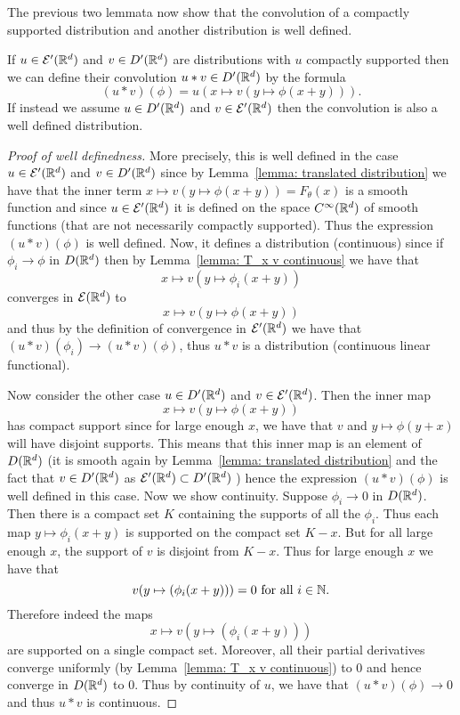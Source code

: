 \documentclass[twoside, a4paper, 10pt]{amsart}
\begin{document}
The previous two lemmata now show that the convolution of a compactly supported distribution and another distribution is well defined.

\begin{mydef} If $u \in \mathcal{E}'(\mathbb{R}^d)$ and $v \in D'(\mathbb{R}^d)$ are distributions with $u$ compactly supported then we can define their convolution $u * v \in D'(\mathbb{R}^d)$ by the formula $$(u * v)(\phi) = u(x \mapsto v(y \mapsto \phi(x+y))).$$ If instead we assume $u \in D'(\mathbb{R}^d)$ and $v \in \mathcal{E}'(\mathbb{R}^d)$ then the convolution is also a well defined distribution.

\end{mydef}

\begin{proof}[Proof of well definedness] More precisely, this is well defined in the case $u \in \mathcal{E}'(\mathbb{R}^d)$ and $v \in D'(\mathbb{R}^d)$ since by Lemma~\ref{lemma: translated distribution} we have that the inner term $x \mapsto v(y \mapsto \phi(x+y))=F_{\theta}(x)$ is a smooth function and since $u \in \mathcal{E}'(\mathbb{R}^d)$ it is defined on the space $C^{\infty}(\mathbb{R}^d)$ of smooth functions (that are not necessarily compactly supported). Thus the expression $(u * v)(\phi)$ is well defined. Now, it defines a distribution (continuous) since if $\phi_i \to \phi$ in $D(\mathbb{R}^d)$ then by Lemma~\ref{lemma: T_x v continuous} we have that $$x \mapsto v(y \mapsto \phi_i(x+y))$$ converges in $\mathcal{E}(\mathbb{R}^d)$ to $$x \mapsto v(y \mapsto \phi(x+y))$$ and thus by the definition of convergence in $\mathcal{E}'(\mathbb{R}^d)$ we have that $(u * v)(\phi_i) \to (u*v)(\phi)$, thus $u * v$ is a distribution (continuous linear functional).

Now consider the other case $u \in D'(\mathbb{R}^d)$ and $v \in \mathcal{E}'(\mathbb{R}^d)$. Then the inner map $$x \mapsto v(y \mapsto \phi(x+y))$$ has compact support since for large enough $x$, we have that $v$ and $y \mapsto \phi(y+x)$ will have disjoint supports. This means that this inner map is an element of $D(\mathbb{R}^d)$ (it is smooth again by Lemma~\ref{lemma: translated distribution} and the fact that $v \in D'(\mathbb{R}^d)$ as $\mathcal{E}'(\mathbb{R}^d) \subset D'(\mathbb{R}^d)$ ) hence the expression $(u * v)(\phi)$ is well defined in this case. Now we show continuity. Suppose $\phi_i \to 0$ in $D(\mathbb{R}^d)$. Then there is a compact set $K$ containing the supports of all the $\phi_i$. Thus each map $y \mapsto \phi_i(x+y)$ is supported on the compact set $K-x$. But for all large enough $x$, the support of $v$ is disjoint from $K-x$. Thus for large enough $x$ we have that $$v(y \mapsto (\phi_i (x+y))) = 0 \text{ for all } i \in \mathbb{N}.$$ Therefore indeed the maps $$x \mapsto v(y \mapsto (\phi_i (x+y)))$$ are supported on a single compact set. Moreover, all their partial derivatives converge uniformly (by Lemma~\ref{lemma: T_x v continuous}) to $0$ and hence converge in $D(\mathbb{R}^d)$ to $0$. Thus by continuity of $u$, we have that $(u*v)(\phi) \to 0$ and thus $u*v$ is continuous. \end{proof}
\end{document}

